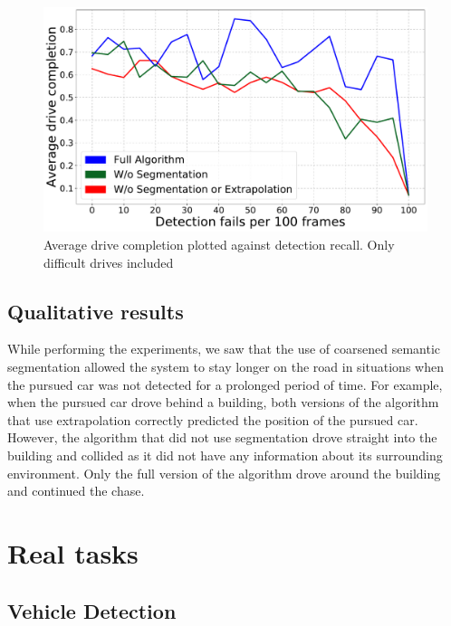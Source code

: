 \documentclass{ctuthesis/ctuthesis}
\begin{document}
\begin{figure}[]
    \centering
    \includegraphics[width=1\textwidth]{images/recall_chart7_difficult.pdf}
    
    \caption{Average drive completion plotted against detection recall. Only difficult drives included}\label{f:detection_recall_difficult}
\end{figure}


\subsection{Qualitative results}
While performing the experiments, we saw that the use of coarsened semantic segmentation allowed the system to stay longer on the road in situations when the pursued car was not detected for a prolonged period of time. For example, when the pursued car drove behind a building, both versions of the algorithm that use extrapolation correctly predicted the position of the pursued car. However, the algorithm that did not use segmentation drove straight into the building and collided as it did not have any information about its surrounding environment. Only the full version of the algorithm drove around the building and continued the chase.






\section{Real tasks}
\subsection{Vehicle Detection}
\end{document}
